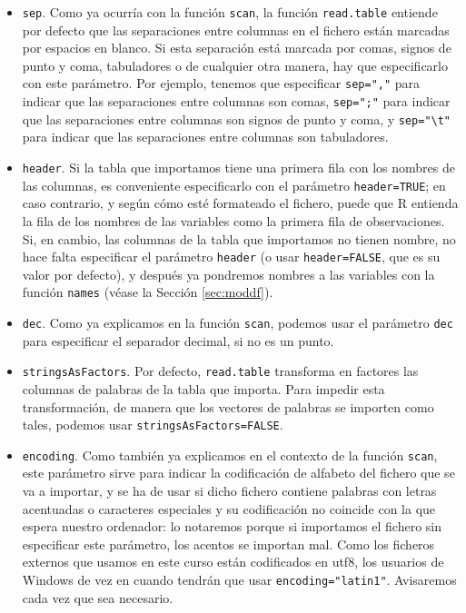 \documentclass[
]{book}
\theoremstyle{definition}
\theoremstyle{definition}
\theoremstyle{definition}
\theoremstyle{remark}
\begin{document}
\begin{itemize}
\item
  \texttt{sep}. Como ya ocurría con la función \texttt{scan}, la función \texttt{read.table} entiende por defecto que las separaciones entre columnas en el fichero están marcadas por espacios en blanco. Si esta separación está marcada por comas, signos de punto y coma, tabuladores o de cualquier otra manera, hay que especificarlo con este parámetro. Por ejemplo, tenemos que especificar \texttt{sep=","} para indicar que las separaciones entre columnas son comas, \texttt{sep=";"} para indicar que las separaciones entre columnas son signos de punto y coma, y \texttt{sep="\textbackslash{}t"} para indicar que las separaciones entre columnas son tabuladores.
\item
  \texttt{header}. Si la tabla que importamos tiene una primera fila con los nombres de las columnas, es conveniente especificarlo con el parámetro \texttt{header=TRUE}; en caso contrario, y según cómo esté formateado el fichero, puede que R entienda la fila de los nombres de las variables como la primera fila de observaciones.
  Si, en cambio, las columnas de la tabla que importamos no tienen nombre, no hace falta especificar el parámetro \texttt{header} (o usar \texttt{header=FALSE}, que es su valor por defecto), y después ya pondremos nombres a las variables con la función \texttt{names} (véase la Sección \ref{sec:moddf}).
\item
  \texttt{dec}. Como ya explicamos en la función \texttt{scan}, podemos usar el parámetro \texttt{dec} para especificar el separador decimal, si no es un punto.
\item
  \texttt{stringsAsFactors}. Por defecto, \texttt{read.table} transforma en factores las columnas de palabras de la tabla que importa. Para impedir esta transformación, de manera que los vectores de palabras se importen como tales, podemos usar \texttt{stringsAsFactors=FALSE}.
\item
  \texttt{encoding}. Como también ya explicamos en el contexto de la función \texttt{scan}, este parámetro sirve para indicar la codificación de alfabeto del fichero que se va a importar, y se ha de usar si dicho fichero contiene palabras con letras acentuadas o caracteres especiales y su codificación no coincide con la que espera nuestro ordenador: lo notaremos porque si importamos el fichero sin especificar este parámetro, los acentos se importan mal. Como los ficheros externos que usamos en este curso están codificados en utf8, los usuarios de Windows de vez en cuando tendrán que usar \texttt{encoding="latin1"}. Avisaremos cada vez que sea necesario.
\end{itemize}
\end{document}
